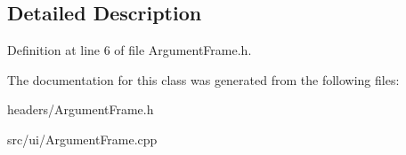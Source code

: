 \subsection{Detailed Description}


Definition at line 6 of file Argument\+Frame.\+h.



The documentation for this class was generated from the following files\+:\begin{DoxyCompactItemize}
\item 
headers/Argument\+Frame.\+h\item 
src/ui/Argument\+Frame.\+cpp\end{DoxyCompactItemize}
